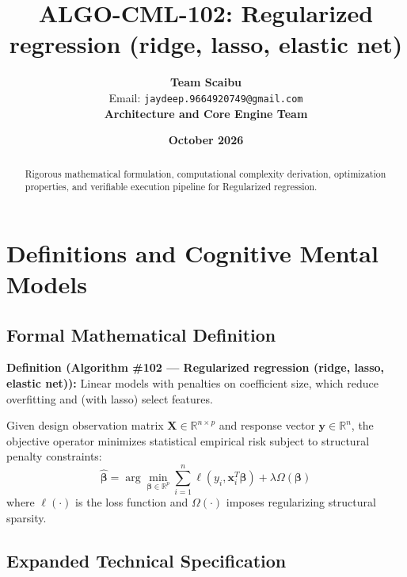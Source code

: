 \documentclass[11pt,a4paper]{article}
\title{\textbf{ALGO-CML-102: Regularized regression (ridge, lasso, elastic net)}}
\author{\textbf{Team Scaibu} \\ \small Email: \texttt{jaydeep.9664920749@gmail.com} \\ \small \textbf{Architecture and Core Engine Team}}
\date{\textbf{October 2026}}
\theoremstyle{definition}
\begin{document}
\maketitle

\begin{abstract}
Rigorous mathematical formulation, computational complexity derivation, optimization properties, and verifiable execution pipeline for Regularized regression.
\end{abstract}

\section{Definitions and Cognitive Mental Models}

\subsection{Formal Mathematical Definition}
\textbf{Definition (Algorithm \#102 --- Regularized regression (ridge, lasso, elastic net)):}
Linear models with penalties on coefficient size, which reduce overfitting and (with lasso) select features.

Given design observation matrix $\mathbf{X} \in \mathbb{R}^{n \times p}$ and response vector $\mathbf{y} \in \mathbb{R}^n$, the objective operator minimizes statistical empirical risk subject to structural penalty constraints:
\begin{equation}
\hat{\boldsymbol{\beta}} = \arg\min_{\boldsymbol{\beta} \in \mathbb{R}^p} \sum_{i=1}^n \ell(y_i, \mathbf{x}_i^T \boldsymbol{\beta}) + \lambda \Omega(\boldsymbol{\beta})
\end{equation}
where $\ell(\cdot)$ is the loss function and $\Omega(\cdot)$ imposes regularizing structural sparsity.

\subsection{Expanded Technical Specification}
\end{document}
